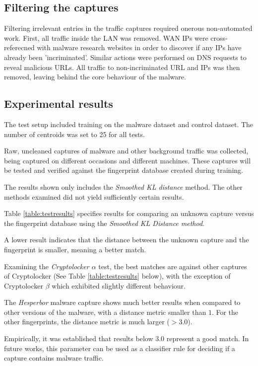 \documentclass[9pt,journal,compsoc]{IEEEtran}
\begin{document}
\subsection{Filtering the captures}
Filtering irrelevant entries in the traffic captures required onerous non-automated work.
First, all traffic inside the LAN was removed. WAN IPs were cross-referecned with malware research websites in order to discover if any IPs have already been 'incriminated'.
Similar actions were performed on DNS requests to reveal malicious URLs.
All traffic to non-incriminated URL and IPs was then removed, leaving behind the core behaviour of the malware.

\subsection{Experimental results}
The test setup included training on the malware dataset and control dataset.
The number of centroids was set to 25 for all tests.

Raw, uncleaned captures of malware and other background traffic was collected, being captured on different occasions and different machines. These captures will be tested and verified against the fingerprint database created during training.

The results shown only includes the {\em Smoothed KL distance} method. The other methods examined did not yield sufficiently certain results.

Table \ref{table:testresults} specifies results for comparing an unknown capture versus the fingerprint database using the {\em Smoothed KL Distance method}.

A lower result indicates that the distance between the unknown capture and the fingerprint is smaller, meaning a better match.

Examining the \emph{Cryptolocker $\alpha$} test, the best matches are against other captures of Cryptolocker (See Table \ref{table:testresults} below), with the exception of Cryptolocker $\beta$ which exhibited slightly different behaviour.

The \emph{Hesperbor} malware capture shows much better results when compared to other versions of the malware, with a distance metric smaller than $1$.
For the other fingerprints, the distance metric is much larger ($>3.0$).

Empirically, it was established that results below $3.0$ represent a good match. In future works, this parameter can be used as a classifier rule for deciding if a capture contains malware traffic.
\end{document}
